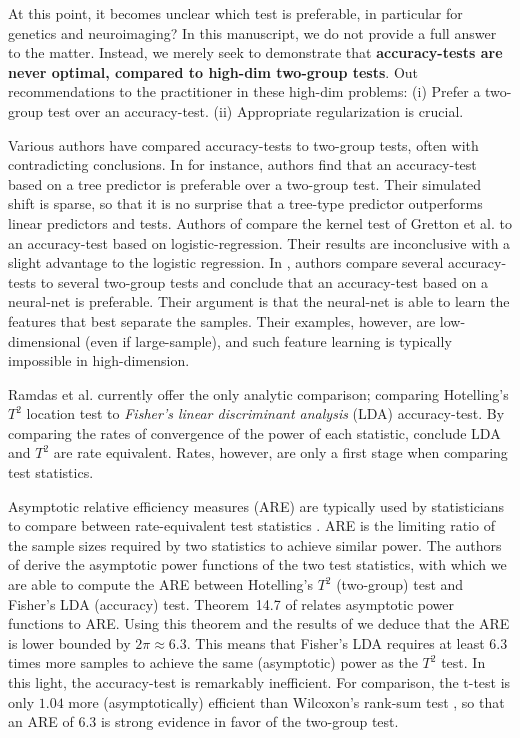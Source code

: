 \documentclass[]{bio}
\begin{document}
At this point, it becomes unclear which test is preferable, in particular for genetics and neuroimaging?
In this manuscript, we do not provide a full answer to the matter.
Instead, we merely seek to demonstrate that \textbf{accuracy-tests are never optimal, compared to high-dim two-group tests}.
Out recommendations to the practitioner in these high-dim problems:
(i) Prefer a two-group test over an accuracy-test. 
(ii) Appropriate regularization is crucial. 

Various authors have compared accuracy-tests to two-group tests, often with contradicting conclusions.
In \cite{yu2007two} for instance, authors find that an accuracy-test based on a tree predictor is preferable over a two-group test. 
Their simulated shift is sparse, so that it is no surprise that a tree-type predictor outperforms linear predictors and tests. 
Authors of \cite{olivetti2013kernel} compare the kernel test of Gretton et al. \cite{gretton_kernel_2012-1} to an accuracy-test based on logistic-regression.
Their results are inconclusive with a slight advantage to the logistic regression.
In \cite{lopez2016revisiting}, authors compare several accuracy-tests to several two-group tests and conclude that an accuracy-test based on a neural-net is preferable. 
Their argument is that the neural-net is able to learn the features that best separate the samples. 
Their examples, however, are low-dimensional (even if large-sample), and such feature learning is typically impossible in high-dimension.

Ramdas et al. \cite{ramdas_classification_2016} currently offer the only analytic comparison; comparing Hotelling's $T^2$ location test to \emph{Fisher's linear discriminant analysis} (LDA) accuracy-test. 
By comparing the rates of convergence of the power of each statistic, \cite{ramdas_classification_2016} conclude LDA and $T^2$ are rate equivalent. 
Rates, however, are only a first stage when comparing test statistics. 

Asymptotic relative efficiency measures (ARE) are typically used by statisticians to compare between rate-equivalent test statistics \cite{vaart_asymptotic_1998}.
ARE is the limiting ratio of the sample sizes required by two statistics to achieve similar power. 
The authors of \cite{ramdas_classification_2016} derive the asymptotic power functions of the two test statistics, with which we are able to compute the ARE between Hotelling's $T^2$ (two-group) test and Fisher's LDA (accuracy) test.
Theorem~14.7 of \cite{vaart_asymptotic_1998} relates asymptotic power functions to ARE.
Using this theorem and the results of \cite{ramdas_classification_2016} we deduce that the ARE is lower bounded by $2 \pi \approx 6.3$.
This means that Fisher's LDA requires at least $6.3$ times more samples to achieve the same (asymptotic) power as the $T^2$ test. 
In this light, the accuracy-test is remarkably inefficient.  
For comparison, the t-test is only $1.04$ more (asymptotically) efficient than Wilcoxon's rank-sum test \cite{lehmann_parametric_2009}, so that an ARE of $6.3$ is strong evidence in favor of the two-group test. 
\end{document}
